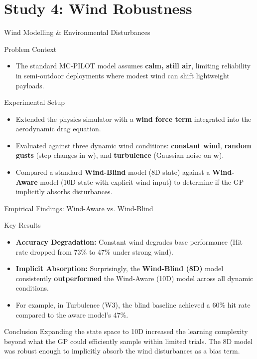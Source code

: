 \documentclass{if-beamer}
\begin{document}
\section{Study 4: Wind Robustness}

\begin{frame}{Wind Modelling \& Environmental Disturbances}
    \begin{alertblock}{Problem Context}
        \begin{itemize}
            \item The standard MC-PILOT model assumes \textbf{calm, still air}, limiting reliability in semi-outdoor deployments where modest wind can shift lightweight payloads.
        \end{itemize}
    \end{alertblock}
    \begin{block}{Experimental Setup}
        \begin{itemize}
            \item Extended the physics simulator with a \textbf{wind force term} integrated into the aerodynamic drag equation.
            \item Evaluated against three dynamic wind conditions: \textbf{constant wind}, \textbf{random gusts} (step changes in $\mathbf{w}$), and \textbf{turbulence} (Gaussian noise on $\mathbf{w}$).
            \item Compared a standard \textbf{Wind-Blind} model (8D state) against a \textbf{Wind-Aware} model (10D state with explicit wind input) to determine if the GP implicitly absorbs disturbances.
        \end{itemize}
    \end{block}
\end{frame}

\begin{frame}{Empirical Findings: Wind-Aware vs. Wind-Blind}
    \begin{block}{Key Results}
        \begin{itemize}
            \item \textbf{Accuracy Degradation:} Constant wind degrades base performance (Hit rate dropped from 73\% to 47\% under strong wind).
            \item \textbf{Implicit Absorption:} Surprisingly, the \textbf{Wind-Blind (8D)} model consistently \textbf{outperformed} the Wind-Aware (10D) model across all dynamic conditions.
            \item For example, in Turbulence (W3), the blind baseline achieved a 60\% hit rate compared to the aware model's 47\%.
        \end{itemize}
    \end{block}
    \begin{alertblock}{Conclusion}
        Expanding the state space to 10D increased the learning complexity beyond what the GP could efficiently sample within limited trials. The 8D model was robust enough to implicitly absorb the wind disturbances as a bias term.
    \end{alertblock}
\end{frame}
\end{document}
